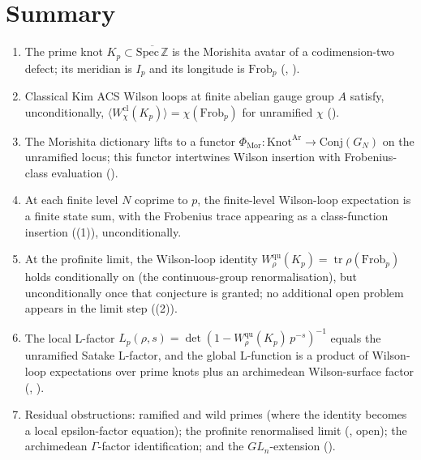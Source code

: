 \section{Summary}
\label{v4-arith:w9-r1:summary}

\begin{enumerate}
\item The prime knot \(K_{p}\subset\overline{\mathrm{Spec}\,\mathbb Z}\)
is the Morishita avatar of a codimension-two defect; its meridian is
\(I_{p}\) and its longitude is \(\mathrm{Frob}_{p}\)
(,
).

\item Classical Kim ACS Wilson loops at finite abelian gauge
group \(A\) satisfy, unconditionally,
\(\langle W^{\mathrm{cl}}_{\chi}(K_{p})\rangle=\chi(\mathrm{Frob}_{p})\)
for unramified \(\chi\)
().

\item The Morishita dictionary lifts to a functor
\(\Phi_{\mathrm{Mor}}\colon\mathrm{Knot}^{\mathrm{Ar}}\to\mathrm{Conj}(G_{N})\)
on the unramified locus; this functor intertwines Wilson insertion
with Frobenius-class evaluation
().

\item At each finite level \(N\) coprime to \(p\), the finite-level
Wilson-loop expectation is a finite state sum, with the Frobenius
trace appearing as a class-function insertion
((1)), unconditionally.

\item At the profinite limit, the Wilson-loop identity
\(W^{\mathrm{qu}}_{\rho}(K_{p})=\operatorname{tr}\rho(\mathrm{Frob}_{p})\)
holds conditionally on
 (the continuous-group
renormalisation), but unconditionally once that conjecture is granted;
no additional open problem appears in the limit step
((2)).

\item The local L-factor
\(L_{p}(\rho,s)=\det(1-W^{\mathrm{qu}}_{\rho}(K_{p})\,p^{-s})^{-1}\)
equals the unramified Satake L-factor, and the global L-function is a
product of Wilson-loop expectations over prime knots plus an
archimedean Wilson-surface factor
(,
).

\item Residual obstructions: ramified and wild primes (where the identity
becomes a local epsilon-factor equation); the profinite renormalised limit
(, open); the archimedean
\(\Gamma\)-factor identification; and the \(GL_{n}\)-extension
().
\end{enumerate}

